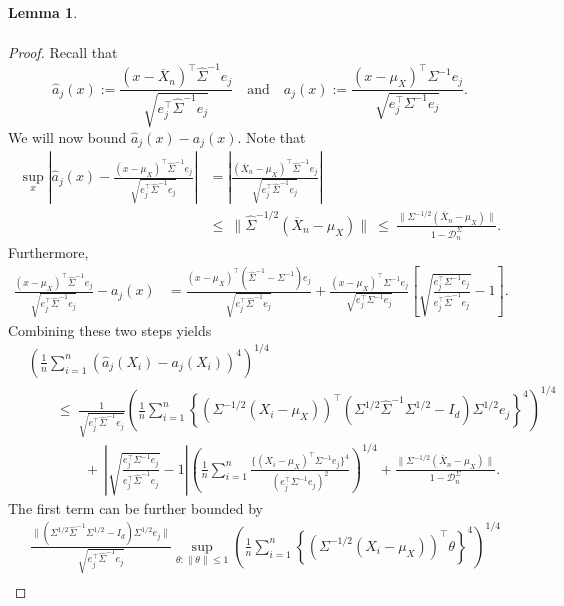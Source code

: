 \documentclass[11pt]{article}
\newtheorem{lemma}[theorem]{Lemma}
\begin{document}
\begin{appendices}
\begin{lemma}
\begin{align*}
\end{align*}
\end{lemma}
\begin{proof}
Recall that
\[
\widehat{a}_j(x) := \frac{(x - \overline{X}_n)^{\top}\widehat{\Sigma}^{-1}e_j}{\sqrt{e_j^{\top}\widehat{\Sigma}^{-1}e_j}}\quad\mbox{and}\quad a_j(x) := \frac{(x - \mu_X)^{\top}\Sigma^{-1}e_j}{\sqrt{e_j^{\top}\Sigma^{-1}e_j}}.
\]
We will now bound $\widehat{a}_j(x) - a_j(x)$. Note that
\begin{align*}
\sup_{x}\left|\widehat{a}_j(x) - \frac{(x - \mu_{X})^{\top}\widehat{\Sigma}^{-1}e_j}{\sqrt{e_j^{\top}\widehat{\Sigma}^{-1}e_j}}\right| &= \left|\frac{(\overline{X}_n - \mu_X)^{\top}\widehat{\Sigma}^{-1}e_j}{\sqrt{e_j^{\top}\widehat{\Sigma}^{-1}e_j}}\right|\\ ~&\le~ \|\widehat{\Sigma}^{-1/2}(\overline{X}_n - \mu_X)\| ~\le~ \frac{\|\Sigma^{-1/2}(\overline{X}_n - \mu_X)\|}{1 - \mathcal{D}_n^{\Sigma}}. 
\end{align*}
Furthermore, 
\begin{align*}
\frac{(x - \mu_X)^{\top}\widehat{\Sigma}^{-1}e_j}{\sqrt{e_j^{\top}\widehat{\Sigma}^{-1}e_j}} - a_j(x) &= \frac{(x - \mu_X)^{\top}(\widehat{\Sigma}^{-1} - \Sigma^{-1})e_j}{\sqrt{e_j^{\top}\widehat{\Sigma}^{-1}e_j}} + \frac{(x - \mu_X)^{\top}\Sigma^{-1}e_j}{\sqrt{e_j^{\top}\Sigma^{-1}e_j}}\left[\sqrt{\frac{e_j^{\top}\Sigma^{-1}e_j}{e_j^{\top}\widehat{\Sigma}^{-1}e_j}} - 1\right].
\end{align*}
Combining these two steps yields
\begin{align*}
&\left(\frac{1}{n}\sum_{i=1}^n (\widehat{a}_j(X_i) - a_j(X_i))^4\right)^{1/4}\\ ~&\qquad\le~ \frac{1}{\sqrt{e_j^{\top}\widehat{\Sigma}^{-1}e_j}}\left(\frac{1}{n}\sum_{i=1}^n \left\{(\Sigma^{-1/2}(X_i - \mu_X))^{\top}(\Sigma^{1/2}\widehat{\Sigma}^{-1}\Sigma^{1/2} - I_d)\Sigma^{1/2}e_j\right\}^4\right)^{1/4}\\
~&\qquad\qquad+~ \left|\sqrt{\frac{e_j^{\top}\Sigma^{-1}e_j}{e_j^{\top}\widehat{\Sigma}^{-1}e_j}} - 1\right|\left(\frac{1}{n}\sum_{i=1}^n \frac{\{(X_i - \mu_X)^{\top}\Sigma^{-1}e_j\}^4}{(e_j^{\top}\Sigma^{-1}e_j)^2}\right)^{1/4} + \frac{\|\Sigma^{-1/2}(\overline{X}_n - \mu_X)\|}{1 - \mathcal{D}_n^{\Sigma}}.
\end{align*}
The first term can be further bounded by
\begin{align*}
&\frac{\|(\Sigma^{1/2}\widehat{\Sigma}^{-1}\Sigma^{1/2} - I_d)\Sigma^{1/2}e_j\|}{\sqrt{e_j^{\top}\widehat{\Sigma}^{-1}e_j}}\sup_{\theta:\|\theta\| \le 1}\left(\frac{1}{n}\sum_{i=1}^n \left\{(\Sigma^{-1/2}(X_i - \mu_X))^{\top}\theta\right\}^4\right)^{1/4}\\

\end{align*}
\end{proof}
\end{appendices}
\end{document}
